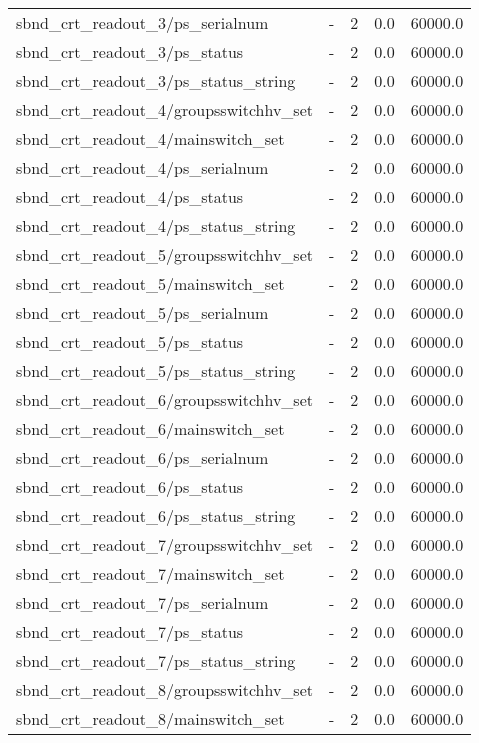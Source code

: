 \begin{center}
\begin{longtable}{l | l l l l }
sbnd\_crt\_readout\_3/ps\_serialnum & - & 2 & 0.0 & 60000.0\\ 
sbnd\_crt\_readout\_3/ps\_status & - & 2 & 0.0 & 60000.0\\ 
sbnd\_crt\_readout\_3/ps\_status\_string & - & 2 & 0.0 & 60000.0\\ 
sbnd\_crt\_readout\_4/groupsswitchhv\_set & - & 2 & 0.0 & 60000.0\\ 
sbnd\_crt\_readout\_4/mainswitch\_set & - & 2 & 0.0 & 60000.0\\ 
sbnd\_crt\_readout\_4/ps\_serialnum & - & 2 & 0.0 & 60000.0\\ 
sbnd\_crt\_readout\_4/ps\_status & - & 2 & 0.0 & 60000.0\\ 
sbnd\_crt\_readout\_4/ps\_status\_string & - & 2 & 0.0 & 60000.0\\ 
sbnd\_crt\_readout\_5/groupsswitchhv\_set & - & 2 & 0.0 & 60000.0\\ 
sbnd\_crt\_readout\_5/mainswitch\_set & - & 2 & 0.0 & 60000.0\\ 
sbnd\_crt\_readout\_5/ps\_serialnum & - & 2 & 0.0 & 60000.0\\ 
sbnd\_crt\_readout\_5/ps\_status & - & 2 & 0.0 & 60000.0\\ 
sbnd\_crt\_readout\_5/ps\_status\_string & - & 2 & 0.0 & 60000.0\\ 
sbnd\_crt\_readout\_6/groupsswitchhv\_set & - & 2 & 0.0 & 60000.0\\ 
sbnd\_crt\_readout\_6/mainswitch\_set & - & 2 & 0.0 & 60000.0\\ 
sbnd\_crt\_readout\_6/ps\_serialnum & - & 2 & 0.0 & 60000.0\\ 
sbnd\_crt\_readout\_6/ps\_status & - & 2 & 0.0 & 60000.0\\ 
sbnd\_crt\_readout\_6/ps\_status\_string & - & 2 & 0.0 & 60000.0\\ 
sbnd\_crt\_readout\_7/groupsswitchhv\_set & - & 2 & 0.0 & 60000.0\\ 
sbnd\_crt\_readout\_7/mainswitch\_set & - & 2 & 0.0 & 60000.0\\ 
sbnd\_crt\_readout\_7/ps\_serialnum & - & 2 & 0.0 & 60000.0\\ 
sbnd\_crt\_readout\_7/ps\_status & - & 2 & 0.0 & 60000.0\\ 
sbnd\_crt\_readout\_7/ps\_status\_string & - & 2 & 0.0 & 60000.0\\ 
sbnd\_crt\_readout\_8/groupsswitchhv\_set & - & 2 & 0.0 & 60000.0\\ 
sbnd\_crt\_readout\_8/mainswitch\_set & - & 2 & 0.0 & 60000.0\\ 

\end{longtable}
\end{center}
